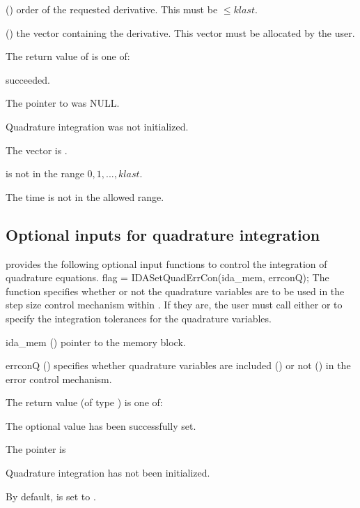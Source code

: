 {{\begin{args}
  \item[\id{k}] () order of the requested derivative.  This
    must be $\leq klast$.
  \item[\id{dkyQ}] ()
    the vector containing the derivative. This vector must be allocated by the user.
  \end{args}
}
{
  The return value  of  is one of:
  \begin{args}
  \item[\Id{IDA\_SUCCESS}]
     succeeded.
  \item[\Id{IDA\_MEM\_NULL}]
    The pointer to  was NULL.
  \item[\Id{IDA\_NO\_QUAD}]
    Quadrature integration was not initialized.
  \item[\Id{IDA\_BAD\_DKY}]
    The vector  is .
  \item[\Id{IDA\_BAD\_K}]
     is not in the range $0, 1, ..., klast$.
  \item[\Id{IDA\_BAD\_T}]
    The time  is not in the allowed range.
  \end{args}
}
{}


\subsection{Optional inputs for quadrature integration}\label{ss:quad_optional_input}
{\idas} provides the following optional input functions to control the integration
of quadrature equations.
{
 flag = IDASetQuadErrCon(ida\_mem, errconQ);
}
{
  The function  specifies whether or not the
  quadrature variables are to be used in the step size control mechanism
  within {\idas}.  If they are, the user must call either 
  or  to specify the
  integration tolerances for the quadrature variables.
}
{
  \begin{args}
  \item[ida\_mem] ()
    pointer to the {\idas} memory block.
  \item[errconQ] ()
    specifies whether quadrature variables are included () or not
    () in the error control mechanism.
  \end{args}
}
{
  The return value  (of type ) is one of:
  \begin{args}
  \item[\Id{IDA\_SUCCESS}]
    The optional value has been successfully set.
  \item[\Id{IDA\_MEM\_NULL}]
    The  pointer is 
  \item[\Id{IDA\_NO\_QUAD}]
    Quadrature integration has not been initialized.
  \end{args}
}
{
  By default,  is set to .

}}

